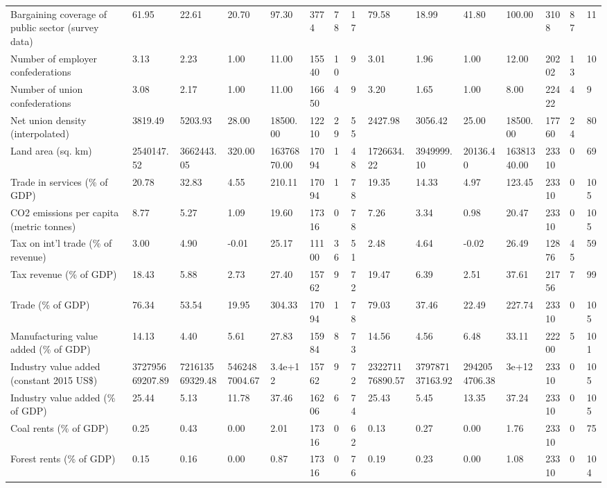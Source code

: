 \begin{longtable}{lllllllllllllll}
\addlinespace
Bargaining coverage of public sector (survey data) & 61.95 & 22.61 & 20.70 & 97.30 & 3774 & 78 & 17 & 79.58 & 18.99 & 41.80 & 100.00 & 3108 & 87 & 11\\
Number of employer confederations & 3.13 & 2.23 & 1.00 & 11.00 & 15540 & 10 & 9 & 3.01 & 1.96 & 1.00 & 12.00 & 20202 & 13 & 10\\
Number of union confederations & 3.08 & 2.17 & 1.00 & 11.00 & 16650 & 4 & 9 & 3.20 & 1.65 & 1.00 & 8.00 & 22422 & 4 & 9\\
Net union density (interpolated) & 3819.49 & 5203.93 & 28.00 & 18500.00 & 12210 & 29 & 55 & 2427.98 & 3056.42 & 25.00 & 18500.00 & 17760 & 24 & 80\\
Land area (sq. km) & 2540147.52 & 3662443.05 & 320.00 & 16376870.00 & 17094 & 1 & 48 & 1726634.22 & 3949999.10 & 20136.40 & 16381340.00 & 23310 & 0 & 69\\
\addlinespace
Trade in services (\% of GDP) & 20.78 & 32.83 & 4.55 & 210.11 & 17094 & 1 & 78 & 19.35 & 14.33 & 4.97 & 123.45 & 23310 & 0 & 105\\
CO2 emissions per capita (metric tonnes) & 8.77 & 5.27 & 1.09 & 19.60 & 17316 & 0 & 78 & 7.26 & 3.34 & 0.98 & 20.47 & 23310 & 0 & 105\\
Tax on int'l trade (\% of revenue) & 3.00 & 4.90 & -0.01 & 25.17 & 11100 & 36 & 51 & 2.48 & 4.64 & -0.02 & 26.49 & 12876 & 45 & 59\\
Tax revenue (\% of GDP) & 18.43 & 5.88 & 2.73 & 27.40 & 15762 & 9 & 72 & 19.47 & 6.39 & 2.51 & 37.61 & 21756 & 7 & 99\\
Trade (\% of GDP) & 76.34 & 53.54 & 19.95 & 304.33 & 17094 & 1 & 78 & 79.03 & 37.46 & 22.49 & 227.74 & 23310 & 0 & 105\\
\addlinespace
Manufacturing value added (\% of GDP) & 14.13 & 4.40 & 5.61 & 27.83 & 15984 & 8 & 73 & 14.56 & 4.56 & 6.48 & 33.11 & 22200 & 5 & 101\\
Industry value added (constant 2015 US\$) & 372795669207.89 & 721613569329.48 & 5462487004.67 & 3.4e+12 & 15762 & 9 & 72 & 232271176890.57 & 379787137163.92 & 2942054706.38 & 3e+12 & 23310 & 0 & 105\\
Industry value added (\% of GDP) & 25.44 & 5.13 & 11.78 & 37.46 & 16206 & 6 & 74 & 25.43 & 5.45 & 13.35 & 37.24 & 23310 & 0 & 105\\
Coal rents (\% of GDP) & 0.25 & 0.43 & 0.00 & 2.01 & 17316 & 0 & 62 & 0.13 & 0.27 & 0.00 & 1.76 & 23310 & 0 & 75\\
Forest rents (\% of GDP) & 0.15 & 0.16 & 0.00 & 0.87 & 17316 & 0 & 76 & 0.19 & 0.23 & 0.00 & 1.08 & 23310 & 0 & 104\\

\end{longtable}
